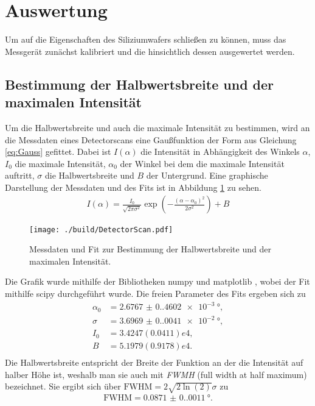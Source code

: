 \section{Auswertung}
\label{sec:Auswertung}

Um auf die Eigenschaften des Siliziumwafers schließen zu können, muss das Messgerät zunächst kalibriert und die hinsichtlich dessen ausgewertet werden.

\subsection{Bestimmung der Halbwertsbreite und der maximalen Intensität}
\label{subsec:Halbwertsbreite}

Um die Halbwertsbreite und auch die maximale Intensität zu bestimmen, wird an die Messdaten eines Detectorscans eine Gaußfunktion der Form aus Gleichung \ref{eq:Gauss} gefittet. 
Dabei ist $I(\alpha)$ die Intensität in Abhängigkeit des Winkels $\alpha$, $I_0$ die maximale Intensität, $\alpha_0$ der Winkel bei dem die maximale Intensität auftritt, $\sigma$ die Halbwertsbreite und $B$ der Untergrund.
Eine graphische Darstellung der Messdaten und des Fits ist in Abbildung \ref{fig:Gauss} zu sehen.
\begin{align}
    I(\alpha) = \frac{I_0}{\sqrt{2\pi\sigma^2}} \exp\left(-\frac{(\alpha-\alpha_0)^2}{2\sigma^2}\right) +B
    \label{eq:Gauss}
\end{align}
\begin{figure}[H]
    \centering
    \texttt{[image: ./build/DetectorScan.pdf]}
    \caption{Messdaten und Fit zur Bestimmung der Halbwertsbreite und der maximalen Intensität.}
    \label{fig:Gauss}
\end{figure}
\noindent
Die Grafik wurde mithilfe der Bibliotheken numpy \cite{numpy} und matplotlib \cite{matplotlib}, wobei der Fit mithilfe scipy \cite{scipy} durchgeführt wurde.
Die freien Parameter des Fits ergeben sich zu
\begin{align*}
    \alpha_0 &= \SI{2.6767(0.4602)e-3}{\degree}, \\
    \sigma &= \SI{3.6969(0.0041)e-2}{\degree}, \\
    I_0 &= \si{3.4247(0.0411)e4},\\
    B &= \si{5.1979(0.9178)e4}.\\
\end{align*}
Die Halbwertsbreite entspricht der Breite der Funktion an der die Intensität auf halber Höhe ist, weshalb man sie auch mit \textit{FWMH} (full width at half maximum) bezeichnet.
Sie ergibt sich über $\text{FWHM} = 2\sqrt{2\ln(2)}\sigma$ zu
\begin{align*}
    \text{FWHM} = \SI{0.0871(0.0011)}{\degree}.
\end{align*}



